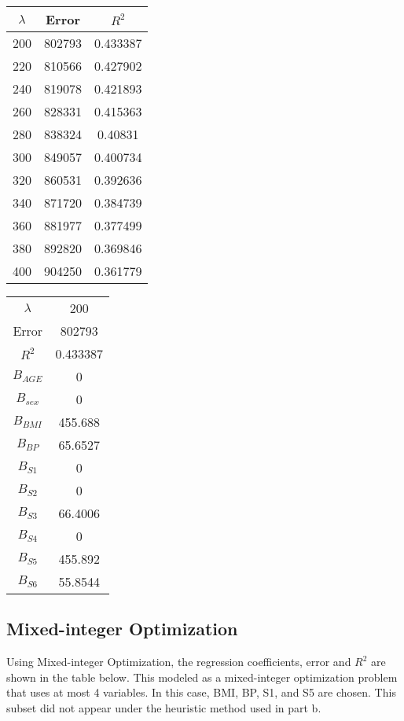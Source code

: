 \documentclass[15pt,a4paper,openright]{article}
\begin{document}
\begin{center}
 \begin{tabular}{||c | c | c||} 
 \hline
 $\lambda$ & Error & $R^2$  \\ [0.5ex] 
 \hline\hline
  200 & 802793 & 0.433387   \\
  220 & 810566 & 0.427902 \\
  240 & 819078 & 0.421893 \\
  260 & 828331 & 0.415363 \\
  280 & 838324 & 0.40831 \\
  300 & 849057 & 0.400734 \\
  320 & 860531 & 0.392636 \\
  340 & 871720 & 0.384739 \\
  360 & 881977 & 0.377499 \\
  380 & 892820 & 0.369846 \\
  400 & 904250 & 0.361779 \\
 [1ex] 
 \hline
\end{tabular}
\end{center}


\begin{center}
 \begin{tabular}{||c | c||} 
 \hline
 $\lambda$ & 200 \\ 
 Error &  802793 \\
 $R^2$ & 0.433387 \\
 $B_{AGE}$ & 0 \\
 $B_{sex}$ & 0 \\
 $B_{BMI}$ & 455.688 \\
 $B_{BP}$ & 65.6527 \\
 $B_{S1}$ & 0 \\
 $B_{S2}$ & 0 \\
 $B_{S3}$ & 66.4006 \\
 $B_{S4}$ & 0 \\
 $B_{S5}$ & 455.892 \\
 $B_{S6}$ & 55.8544 \\ 
[1ex] 
\hline
\end{tabular}
\end{center}


\subsection{Mixed-integer Optimization}

Using Mixed-integer Optimization, the regression coefficients, error and $R^2$ are shown in the table below. This modeled as a mixed-integer optimization problem that uses at most 4 variables. In this case, BMI, BP, S1, and S5 are chosen. This subset did not appear under the heuristic method used in part b. 
\end{document}
